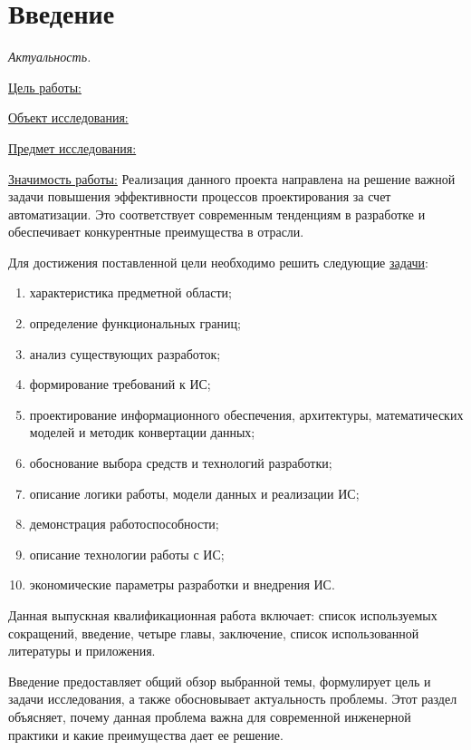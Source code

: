 \chapter*{Введение}

\textit{Актуальность.}
\lipsum[1]

\underline{Цель работы:}
\lipsum[2][1-4]

\underline{Объект исследования:}
\lipsum[3][1]

\underline{Предмет исследования:}
\lipsum[4][1]

\underline{Значимость работы:}
Реализация данного проекта направлена на решение важной
задачи повышения эффективности процессов проектирования за счет автоматизации.
Это соответствует современным тенденциям в разработке
и обеспечивает конкурентные преимущества в отрасли.

Для достижения поставленной цели
необходимо решить следующие \underline{задачи}:

\begin{enumerate}
	\item характеристика предметной области;
	\item определение функциональных границ;
	\item анализ существующих разработок;
	\item формирование требований к ИС;
	\item проектирование информационного обеспечения,
		архитектуры, математических моделей и методик конвертации данных;
	\item обоснование выбора средств и технологий разработки;
	\item описание логики работы, модели данных и реализации ИС;
	\item демонстрация работоспособности;
	\item описание технологии работы с ИС;
	\item экономические параметры разработки и внедрения ИС.
\end{enumerate}

Данная выпускная квалификационная работа включает:
список используемых сокращений, введение, четыре главы, заключение,
список использованной литературы и приложения.

Введение предоставляет общий обзор выбранной темы, формулирует цель
и задачи исследования, а также обосновывает актуальность проблемы.
Этот раздел объясняет,
почему данная проблема важна для современной инженерной практики
и какие преимущества дает ее решение.

